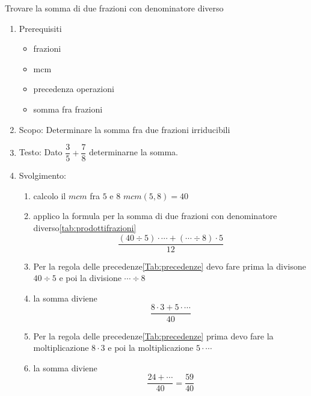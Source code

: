 {%
\begin{table}[H]
	\caption{Trovare la somma di due frazioni con denominatore diverso}
	\label{tab:Trovaresommaduefrazionidenominatorediverso2}
\begin{enumerate}
	\item Prerequisiti 
\begin{itemize}
	\item frazioni
	\item mcm
	 \item precedenza operazioni
 \item somma fra frazioni
\end{itemize}
  \item Scopo: Determinare la somma fra due frazioni irriducibili
  \item Testo: Dato $\dfrac{3}{5}+\dfrac{7}{8}$  determinarne la somma.
  \item Svolgimento: 
  \begin{enumerate}
  \item calcolo il $mcm$ fra $5$ e $8$ $mcm(5,8)=40$
	\item applico la formula per la somma di due frazioni con denominatore diverso\nobs\vref{tab:prodottifrazioni} \[\dfrac{(40\div 5)\cdot \cdots+(\cdots\div 8)\cdot 5}{12}\]
	\item Per la regola delle precedenze\nobs\vref{Tab:precedenze} devo fare prima la divisone $40\div 5$ e poi la divisione $\cdots\div 8$
	\item la somma diviene \[\dfrac{8\cdot 3+5\cdot \cdots}{40}\]
	\item Per la regola delle precedenze\nobs\vref{Tab:precedenze} prima devo fare la moltiplicazione $8\cdot 3$ e poi la moltiplicazione $5\cdot\cdots$
	\item la somma diviene \[\dfrac{24+\cdots}{40}=\dfrac{59}{40}\]
 \end{enumerate}
  \end{enumerate}
\end{table}
}
